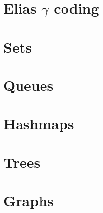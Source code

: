 \section{Elias \texorpdfstring{$\gamma$}{gamma} coding}

\section{Sets}

\section{Queues}

\section{Hashmaps}

\section{Trees}

\section{Graphs}
